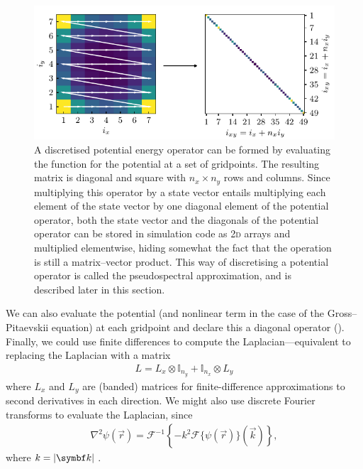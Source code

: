 \begin{figure}[t]
    \centerfloat
    \includegraphics[width=\textwidth]{figures/numerics/potential_unravel.pdf}
    \caption{A discretised potential energy operator can be formed by evaluating the function for the potential at a set of gridpoints. The resulting matrix is diagonal and square with $n_x \times n_y$ rows and columns. Since multiplying this operator by a state vector entails multiplying each element of the state vector by one diagonal element of the potential operator, both the state vector and the diagonals of the potential operator can be stored in simulation code as 2\textsc{d} arrays and multiplied elementwise, hiding somewhat the fact that the operation is still a matrix--vector product. This way of discretising a potential operator is called the pseudospectral approximation, and is described later in this section.}
    \label{fig:potential_unravel}
\end{figure}

We can also evaluate the potential (and nonlinear term in the case of the Gross--Pitaevskii equation) at each gridpoint and declare this a diagonal operator (). Finally, we could use finite differences to compute the Laplacian---equivalent to replacing the Laplacian with a matrix
\begin{align}
L = L_x \otimes \mathbb{I}_{n_y} + \mathbb{I}_{n_x} \otimes L_y 
\end{align} 
where $L_x$ and $L_y$ are (banded) matrices for finite-difference approximations to second derivatives in each direction. We might also use discrete Fourier transforms to evaluate the Laplacian, since
\begin{align}
\nabla^2\psi(\vec r) = \mathcal{F}^{-1}\left\{-k^2\mathcal{F}\{\psi(\vec r)\}(\vec k)\right\},
\end{align}
where $ k = \abs{\vec k}$.

